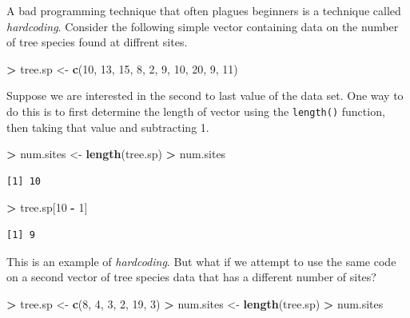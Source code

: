 \documentclass[]{krantz}
\makeatletter
\newenvironment{Shaded}{\begin{snugshade}}{\end{snugshade}}
\newcommand{\KeywordTok}[1]{\textcolor[rgb]{0.27,0.27,0.27}{\textbf{#1}}}
\newcommand{\DecValTok}[1]{\textcolor[rgb]{0.06,0.06,0.06}{#1}}
\newcommand{\StringTok}[1]{\textcolor[rgb]{0.5,0.5,0.5}{#1}}
\newcommand{\OperatorTok}[1]{\textcolor[rgb]{0.43,0.43,0.43}{\textbf{#1}}}
\newcommand{\NormalTok}[1]{#1}
\newenvironment{kframe}{%
\medskip{}
\setlength{\fboxsep}{.8em}
 \def\at@end@of@kframe{}%
 \ifinner\ifhmode%
  \def\at@end@of@kframe{\end{minipage}}%
  \begin{minipage}{\columnwidth}%
 \fi\fi%
 \def\FrameCommand##1{\hskip\@totalleftmargin \hskip-\fboxsep
 \colorbox{shadecolor}{##1}\hskip-\fboxsep
     \hskip-\linewidth \hskip-\@totalleftmargin \hskip\columnwidth}%
 \MakeFramed {\advance\hsize-\width
   \@totalleftmargin\z@ \linewidth\hsize
   \@setminipage}}%
 {\par\unskip\endMakeFramed%
 \at@end@of@kframe}
\renewenvironment{Shaded}{\begin{kframe}}{\end{kframe}}
\makeatother
\begin{document}
A bad programming technique that often plagues beginners is a technique
called \emph{hardcoding}. Consider the following simple vector
containing data on the number of tree species found at diffrent sites.

\begin{Shaded}
\begin{Highlighting}[]
\OperatorTok{>}\StringTok{ }\NormalTok{tree.sp <-}\StringTok{ }\KeywordTok{c}\NormalTok{(}\DecValTok{10}\NormalTok{, }\DecValTok{13}\NormalTok{, }\DecValTok{15}\NormalTok{, }\DecValTok{8}\NormalTok{, }\DecValTok{2}\NormalTok{, }\DecValTok{9}\NormalTok{, }\DecValTok{10}\NormalTok{, }\DecValTok{20}\NormalTok{, }\DecValTok{9}\NormalTok{, }\DecValTok{11}\NormalTok{)}
\end{Highlighting}
\end{Shaded}

Suppose we are interested in the second to last value of the data set.
One way to do this is to first determine the length of vector using the
\texttt{length()} function, then taking that value and subtracting 1.

\begin{Shaded}
\begin{Highlighting}[]
\OperatorTok{>}\StringTok{ }\NormalTok{num.sites <-}\StringTok{ }\KeywordTok{length}\NormalTok{(tree.sp)}
\OperatorTok{>}\StringTok{ }\NormalTok{num.sites}
\end{Highlighting}
\end{Shaded}

\begin{verbatim}
[1] 10
\end{verbatim}

\begin{Shaded}
\begin{Highlighting}[]
\OperatorTok{>}\StringTok{ }\NormalTok{tree.sp[}\DecValTok{10} \OperatorTok{-}\StringTok{ }\DecValTok{1}\NormalTok{]}
\end{Highlighting}
\end{Shaded}

\begin{verbatim}
[1] 9
\end{verbatim}

This is an example of \emph{hardcoding}. But what if we attempt to use
the same code on a second vector of tree species data that has a
different number of sites?

\begin{Shaded}
\begin{Highlighting}[]
\OperatorTok{>}\StringTok{ }\NormalTok{tree.sp <-}\StringTok{ }\KeywordTok{c}\NormalTok{(}\DecValTok{8}\NormalTok{, }\DecValTok{4}\NormalTok{, }\DecValTok{3}\NormalTok{, }\DecValTok{2}\NormalTok{, }\DecValTok{19}\NormalTok{, }\DecValTok{3}\NormalTok{)}
\OperatorTok{>}\StringTok{ }\NormalTok{num.sites <-}\StringTok{ }\KeywordTok{length}\NormalTok{(tree.sp)}
\OperatorTok{>}\StringTok{ }\NormalTok{num.sites}
\end{Highlighting}
\end{Shaded}
\end{document}
